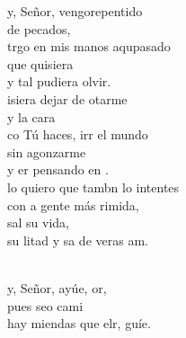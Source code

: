 \begin{cancion}%
	y, Señor, vengorepentido \\
	de  pecados,\\
	trgo en mis manos aqupasado\\
	que  quisiera \\
	y tal  pudiera olvir.\\
	isiera dejar de otarme \\
	y  la cara\\
	co Tú haces, irr el mundo\\
	sin agonzarme \\
	y er pensando en .\\
	lo quiero que tambn lo intentes\\
	con a gente más rimida, \\
	sal su vida,\\
	su litad y sa de veras am.\\\jump\\
	\begin{chorus}%
	y, Señor, ayúe, or,  \\
	pues seo cami\\
	hay miendas que elr, guíe.\\
	\end{chorus}%
	\jump\\
\end{cancion}%
